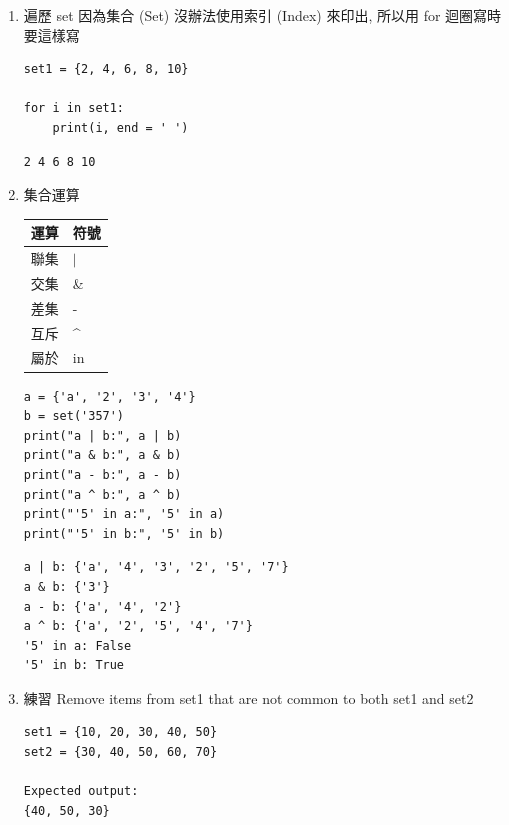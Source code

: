 \documentclass[a4paper,12pt]{article}
\begin{document}
\begin{enumerate}
\begin{verbatim}
True
False
True
False
\end{verbatim}

\item 遍歷 set
\label{sec:org52f12ab}
因為集合 (Set) 沒辦法使用索引 (Index) 來印出, 所以用 for 迴圈寫時要這樣寫\\
\lstset{breaklines=true,language=Python,label= ,caption= ,captionpos=b,firstnumber=1,numbers=left}
\begin{lstlisting}
set1 = {2, 4, 6, 8, 10}

for i in set1:
	print(i, end = ' ')
\end{lstlisting}

\begin{verbatim}
2 4 6 8 10
\end{verbatim}

\item 集合運算
\label{sec:orgd39be44}
\begin{center}
\begin{tabular}{ll}
運算 & 符號\\
\hline
聯集 & \(\vert{}\)\\
交集 & \&\\
差集 & -\\
互斥 & \^{}\\
屬於 & in\\
\end{tabular}
\end{center}
\lstset{breaklines=true,language=Python,label= ,caption= ,captionpos=b,firstnumber=1,numbers=left}
\begin{lstlisting}
a = {'a', '2', '3', '4'}
b = set('357')
print("a | b:", a | b)
print("a & b:", a & b)
print("a - b:", a - b)
print("a ^ b:", a ^ b)
print("'5' in a:", '5' in a)
print("'5' in b:", '5' in b)
\end{lstlisting}

\begin{verbatim}
a | b: {'a', '4', '3', '2', '5', '7'}
a & b: {'3'}
a - b: {'a', '4', '2'}
a ^ b: {'a', '2', '5', '4', '7'}
'5' in a: False
'5' in b: True
\end{verbatim}

\item 練習
\label{sec:org03acce4}
Remove items from set1 that are not common to both set1 and set2\\
\begin{verbatim}
set1 = {10, 20, 30, 40, 50}
set2 = {30, 40, 50, 60, 70}

Expected output:
{40, 50, 30}
\end{verbatim}
\end{enumerate}
\end{document}

